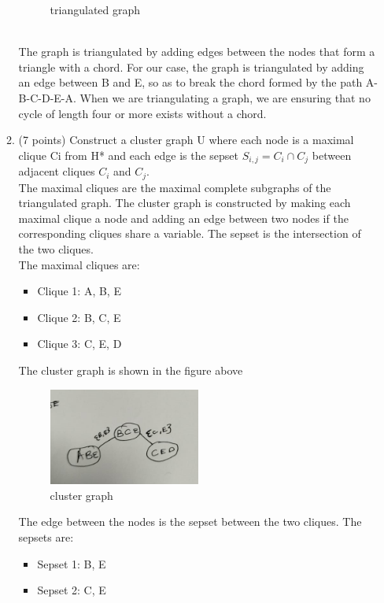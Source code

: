\documentclass[a3paper,12pt]{extarticle} %
\begin{document}
\begin{enumerate}
\begin{enumerate}
\begin{figure}[h!]
            \caption{triangulated graph}
            \label{fig:example_image}
        \end{figure}
        \\The graph is triangulated by adding edges between the nodes that form a triangle with a chord. For our case, the graph is triangulated by adding an edge between B and E, so as to break the chord  formed by the path A-B-C-D-E-A. When we are triangulating a graph, we are ensuring that no cycle of length four or more exists without a chord.
        \item (7 points) Construct a cluster graph U where each node is a maximal clique Ci from H* and each edge is the sepset \(S_{i,j} = C_i \cap C_j\) between adjacent cliques \(C_i\) and \(C_j\).
        \\The maximal cliques are the maximal complete subgraphs of the triangulated graph. The cluster graph is constructed by making each maximal clique a node and adding an edge between two nodes if the corresponding cliques share a variable. The sepset is the intersection of the two cliques.
        \\ The maximal cliques are:
        \begin{itemize}
            \item Clique 1: A, B, E
            \item Clique 2: B, C, E
            \item Clique 3: C, E, D
        \end{itemize}
        The cluster graph is shown in the figure above
        \begin{figure}
            \centering
            \includegraphics[width=0.5\textwidth]{maximal_clique.jpg}
            \caption{cluster graph}
            \label{fig:example_image}
        \end{figure}
        The edge between the nodes is the sepset between the two cliques. The sepsets are:
        \begin{itemize}
            \item Sepset 1: B, E
            \item Sepset 2: C, E

\end{itemize}
\end{enumerate}
\end{enumerate}
\end{document}
